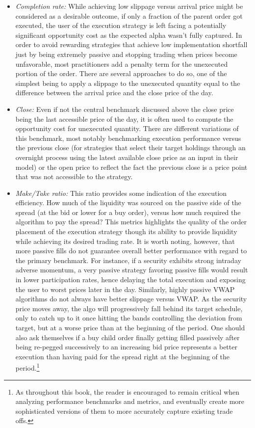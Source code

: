 \begin{itemize}
\item \emph{Completion rate:} While achieving low slippage versus arrival price might be considered as a desirable outcome, if only a fraction of the parent order got executed, the user of the execution strategy is left facing a potentially significant opportunity cost as the expected alpha wasn't fully captured. In order to avoid rewarding strategies that achieve low implementation shortfall just by being extremely passive and stopping trading when prices become unfavorable, most practitioners add a penalty term for the unexecuted portion of the order. There are several approaches to do so, one of the simplest being to apply a slippage to the unexecuted quantity equal to the difference between the arrival price and the close price of the day. 

\item \emph{Close:} Even if not the central benchmark discussed above the close price being the last accessible price of the day, it is often used to compute the opportunity cost for unexecuted quantity. 
There are different variations of this benchmark, most notably benchmarking execution performance versus the previous close (for strategies that select their target holdings through an overnight process using the latest available close price as an input in their model) or the open price to reflect the fact the previous close is a price point that was not accessible to the strategy.

\item \emph{Make/Take ratio:} This ratio provides some indication of the execution efficiency. How much of the liquidity was sourced on the passive side of the spread (at the bid or lower for a buy order), versus how much required the algorithm to pay the spread? This metrics highlights the quality of the order placement of the execution strategy though its ability to provide liquidity while achieving its desired trading rate. It is worth noting, however, that more passive fills do not guarantee overall better performance with regard to the primary benchmark. For instance, if a security exhibits strong intraday adverse momentum, a very passive strategy favoring passive fills would result in lower participation rates, hence delaying the total execution and exposing the user to worst prices later in the day. Similarly, highly passive VWAP algorithms do not always have better slippage versus VWAP. As the security price moves away, the algo will progressively fall behind its target schedule, only to catch up to it once hitting the bands controlling the deviation from target, but at a worse price than at the beginning of the period.
One should also ask themselves if a buy child order finally getting filled passively after being re-pegged successively to an increasing bid price represents a better execution than having paid for the spread right at the beginning of the period.\footnote{As throughout this book, the reader is encouraged to remain critical when analyzing performance benchmarks and metrics, and eventually create more sophisticated versions of them to more accurately capture existing trade offs.}


\end{itemize}
